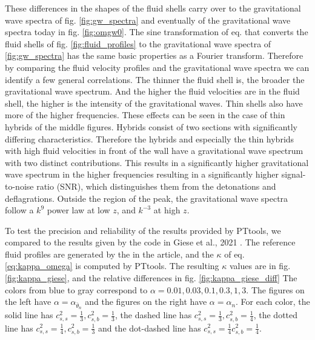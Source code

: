 These differences in the shapes of the fluid shells carry over to the gravitational wave spectra of fig. \ref{fig:gw_spectra} and eventually of the gravitational wave spectra today in fig. \ref{fig:omgw0}.
The sine transformation of eq.  that converts the fluid shells of fig. \ref{fig:fluid_profiles} to the gravitational wave spectra of \ref{fig:gw_spectra} has the same basic properties as a Fourier transform.
Therefore by comparing the fluid velocity profiles and the gravitational wave spectra we can identify a few general correlations.
The thinner the fluid shell is, the broader the gravitational wave spectrum.
And the higher the fluid velocities are in the fluid shell, the higher is the intensity of the gravitational waves.
Thin shells also have more of the higher frequencies.
These effects can be seen in the case of thin hybrids of the middle figures.
Hybrids consist of two sections with significantly differing characteristics.
Therefore the hybrids and especially the thin hybrids with high fluid velocities in front of the wall have a gravitational wave spectrum with two distinct contributions.
This results in a significantly higher gravitational wave spectrum in the higher frequencies resulting in a significantly higher signal-to-noise ratio (SNR),
which distinguishes them from the detonations and deflagrations.
Outside the region of the peak, the gravitational wave spectra follow a $k^9$ power law at low $z$,
and $k^{-3}$ at high $z$.


To test the precision and reliability of the results provided by PTtools,
we compared to the results given by the code in  Giese et al., 2021 \cite[fig. 2]{giese_2021}.
The reference fluid profiles are generated by the in the article,
and the $\kappa$ of eq. \eqref{eq:kappa_omega} is computed by PTtools.
The resulting $\kappa$ values are in fig. \ref{fig:kappa_giese},
and the relative differences in fig. \ref{fig:kappa_giese_diff}
The colors from blue to gray correspond to $\alpha = 0.01, 0.03, 0.1, 0.3, 1, 3$.
The figures on the left have $\alpha = \alpha_{\bar{\theta}_n}$
and the figures on the right have $\alpha = \alpha_n$.
For each color, the solid line has $c_{s,s}^2 = \frac{1}{3}, c_{s,b}^2 = \frac{1}{3}$,
the dashed line has $c_{s,s}^2 = \frac{1}{3}, c_{s,b}^2 = \frac{1}{4}$,
the dotted line has $c_{s,s}^2 = \frac{1}{4}, c_{s,b}^2 = \frac{1}{3}$
and the dot-dashed line has $c_{s,s}^2 = \frac{1}{4} c_{s,b}^2 = \frac{1}{4}$.

